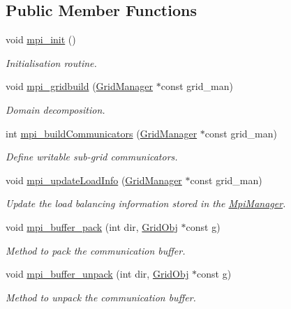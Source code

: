 \subsection*{Public Member Functions}
\begin{DoxyCompactItemize}
\item 
void \hyperlink{class_mpi_manager_a02adaa06e139dfca2bc71e1a1dbf25c7}{mpi\+\_\+init} ()
\begin{DoxyCompactList}\small\item\em Initialisation routine. \end{DoxyCompactList}\item 
void \hyperlink{class_mpi_manager_aaf238b84474a99b665cecb88f9176175}{mpi\+\_\+gridbuild} (\hyperlink{class_grid_manager}{Grid\+Manager} $\ast$const grid\+\_\+man)
\begin{DoxyCompactList}\small\item\em Domain decomposition. \end{DoxyCompactList}\item 
int \hyperlink{class_mpi_manager_a2e81c798922da79025f422106d084567}{mpi\+\_\+build\+Communicators} (\hyperlink{class_grid_manager}{Grid\+Manager} $\ast$const grid\+\_\+man)
\begin{DoxyCompactList}\small\item\em Define writable sub-\/grid communicators. \end{DoxyCompactList}\item 
void \hyperlink{class_mpi_manager_a7668d7a8991ed30f7c0fb789deb68482}{mpi\+\_\+update\+Load\+Info} (\hyperlink{class_grid_manager}{Grid\+Manager} $\ast$const grid\+\_\+man)
\begin{DoxyCompactList}\small\item\em Update the load balancing information stored in the \hyperlink{class_mpi_manager}{Mpi\+Manager}. \end{DoxyCompactList}\item 
void \hyperlink{class_mpi_manager_a376700ed4ead05d85cc6adf1b64b76b6}{mpi\+\_\+buffer\+\_\+pack} (int dir, \hyperlink{class_grid_obj}{Grid\+Obj} $\ast$const g)
\begin{DoxyCompactList}\small\item\em Method to pack the communication buffer. \end{DoxyCompactList}\item 
void \hyperlink{class_mpi_manager_a063eba01ef8efa3fd34dc2ff325dd9f5}{mpi\+\_\+buffer\+\_\+unpack} (int dir, \hyperlink{class_grid_obj}{Grid\+Obj} $\ast$const g)
\begin{DoxyCompactList}\small\item\em Method to unpack the communication buffer. \end{DoxyCompactList}\item 

\end{DoxyCompactItemize}
